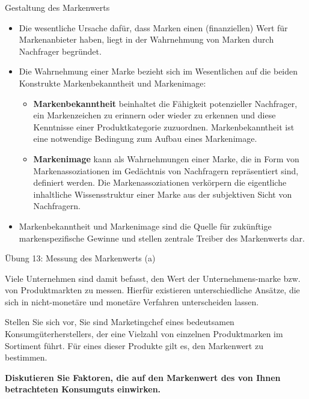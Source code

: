 \documentclass[12pt,ngerman,a4paper,ignorenonframetext,]{beamer}
\providecommand{\tightlist}{%
  \setlength{\itemsep}{0pt}\setlength{\parskip}{0pt}}
\begin{document}
\begin{frame}{Gestaltung des Markenwerts}
\protect\hypertarget{gestaltung-des-markenwerts}{}

\begin{itemize}
\tightlist
\item
  Die wesentliche Ursache dafür, dass Marken einen (finanziellen) Wert
  für Markenanbieter haben, liegt in der Wahrnehmung von Marken durch
  Nachfrager begründet.
\item
  Die Wahrnehmung einer Marke bezieht sich im Wesentlichen auf die
  beiden Konstrukte Markenbekanntheit und Markenimage:

  \begin{itemize}
  \tightlist
  \item
    \textbf{Markenbekanntheit} beinhaltet die Fähigkeit potenzieller
    Nachfrager, ein Markenzeichen zu erinnern oder wieder zu erkennen
    und diese Kenntnisse einer Produktkategorie zuzuordnen.
    Markenbekanntheit ist eine notwendige Bedingung zum Aufbau eines
    Markenimage.
  \item
    \textbf{Markenimage} kann als Wahrnehmungen einer Marke, die in Form
    von Markenassoziationen im Gedächtnis von Nachfragern repräsentiert
    sind, definiert werden. Die Markenassoziationen verkörpern die
    eigentliche inhaltliche Wissensstruktur einer Marke aus der
    subjektiven Sicht von Nachfragern.
  \end{itemize}
\item
  Markenbekanntheit und Markenimage sind die Quelle für zukünftige
  markenspezifische Gewinne und stellen zentrale Treiber des Markenwerts
  dar.
\end{itemize}

\end{frame}

\begin{frame}{Übung 13: Messung des Markenwerts (a)}
\protect\hypertarget{ubung-13-messung-des-markenwerts-a}{}

Viele Unternehmen sind damit befasst, den Wert der Unternehmens-marke
bzw. von Produktmarkten zu messen. Hierfür existieren unterschiedliche
Ansätze, die sich in nicht-monetäre und monetäre Verfahren unterscheiden
lassen.

Stellen Sie sich vor, Sie sind Marketingchef eines bedeutsamen
Konsumgüterherstellers, der eine Vielzahl von einzelnen Produktmarken im
Sortiment führt. Für eines dieser Produkte gilt es, den Markenwert zu
bestimmen.

\textbf{Diskutieren Sie Faktoren, die auf den Markenwert des von Ihnen
betrachteten Konsumguts einwirken.}


\end{frame}
\end{document}
